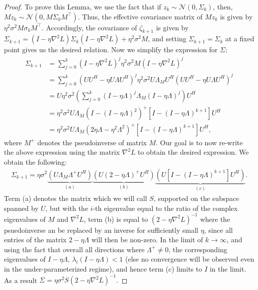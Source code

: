 \begin{proof}
To prove this Lemma, we use the fact that if $z_k \sim \mathcal{N}(0, \Sigma_k)$, then, $M z_k \sim \mathcal{N}(0, M \Sigma_k M^\top)$. Thus, the effective covariance matrix of $M z_k$ is given by $\eta^2 \sigma ^2 M \sigma_k M^\top$. Accordingly, the covariance of $\zeta_{k+1}$ is given by $ \Sigma_{k+1} = (I - \eta \nabla^2 L) \Sigma_k (I - \eta \nabla^2 L) + \eta^2 \sigma^2 M$, and setting $\Sigma_{k+1} = \Sigma_k$ at a fixed point gives us the desired relation. Now we simplify the expression for $\Sigma$:
\begin{align}
    \Sigma_{k+1} &= \sum_{j=0}^k (I - \eta \nabla^2 L)^j \eta^2 \sigma^2 M (I - \eta \nabla^2 L)^j\\ 
    &= \sum_{j=0}^k (UU^H - \eta U \Lambda U^H)^j \eta^2 \sigma^2 U \Lambda_M U^H (UU^H - \eta U \Lambda U^H)^j\\
    &= U \eta^2 \sigma^2 \left( \sum_{j=0}^k (I - \eta \Lambda)^j \Lambda_M (I - \eta \Lambda)^j \right) U^H\\
    &= \eta^2 \sigma^2 U \Lambda_M \left(I - (I - \eta \Lambda)^2 \right)^{+} \left[I - (I - \eta \Lambda)^{k+1}\right] U^H\\
    &= \eta^2 \sigma^2 U \Lambda_M \left(2 \eta \Lambda - \eta^2 \Lambda^2\right)^{+} \left[I - (I - \eta \Lambda)^{k+1}\right] U^H,
\end{align}
where $M^{+}$ denotes the pseudoinverse of matrix $M$. Our goal is to now re-write the above expression using the matrix $\nabla^2 L$ to obtain the desired expression. We obtain the following:
\begin{align}
\Sigma_{k+1} = \eta \sigma^2 \underbrace{\left( U \Lambda_M \Lambda^{+} U^H \right)}_{(a)} \underbrace{\left( U (2 - \eta \Lambda)^{+} U^H \right)}_{(b)} \underbrace{\left(U \left[ I - (I - \eta \Lambda)^{k+1} \right] U^H \right)}_{(c)}.
\end{align}
Term (a) denotes the matrix which we will call $S$, supported on the subspace spanned by $U$, but with the $i$-th eigenvalue equal to the ratio of the complex eigenvalues of $M$ and $\nabla^2 L$, term (b) is equal to $(2 - \eta \nabla^2L)^{-1}$ where the psuedoinverse an be replaced by an inverse for sufficiently small $\eta$, since all entries of the matrix $2 - \eta \Lambda$ will then be non-zero. In the limit of $k \rightarrow \infty$, and using the fact that overall all directions where $\Lambda^+ \neq 0$, the corresponding eigenvalues of $I - \eta \Lambda$, $\lambda_i(I - \eta \Lambda) < 1$ (else no convergence will be observed even in the under-parameterized regime), and hence term (c) limits to $I$ in the limit. As a result $\Sigma = \eta \sigma^2 S (2 - \eta \nabla^2 L)^{-1}.$
    
\end{proof}
